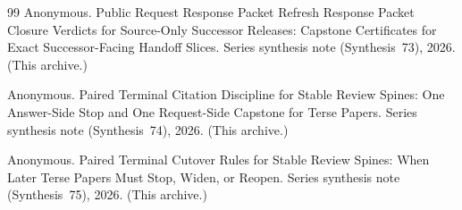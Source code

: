 \documentclass[11pt]{article}
\begin{document}
\begin{thebibliography}{99}
Anonymous.
\newblock Public Request Response Packet Refresh Response Packet Closure Verdicts for Source-Only Successor Releases: Capstone Certificates for Exact Successor-Facing Handoff Slices.
\newblock Series synthesis note (Synthesis~73), 2026. (This archive.)

Anonymous.
\newblock Paired Terminal Citation Discipline for Stable Review Spines: One Answer-Side Stop and One Request-Side Capstone for Terse Papers.
\newblock Series synthesis note (Synthesis~74), 2026. (This archive.)

Anonymous.
\newblock Paired Terminal Cutover Rules for Stable Review Spines: When Later Terse Papers Must Stop, Widen, or Reopen.
\newblock Series synthesis note (Synthesis~75), 2026. (This archive.)

\end{thebibliography}
\end{document}
